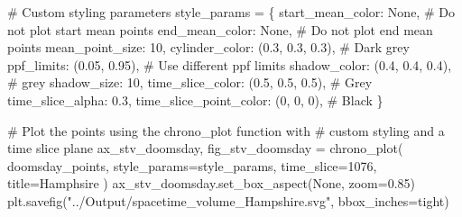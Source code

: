 \documentclass[
  11pt,
  letterpaper,
  DIV=11,
  numbers=noendperiod]{scrartcl}
\newenvironment{Shaded}{\begin{snugshade}}{\end{snugshade}}
\newcommand{\CommentTok}[1]{\textcolor[rgb]{0.37,0.37,0.37}{#1}}
\newcommand{\DecValTok}[1]{\textcolor[rgb]{0.68,0.00,0.00}{#1}}
\newcommand{\FloatTok}[1]{\textcolor[rgb]{0.68,0.00,0.00}{#1}}
\newcommand{\NormalTok}[1]{\textcolor[rgb]{0.00,0.23,0.31}{#1}}
\newcommand{\OperatorTok}[1]{\textcolor[rgb]{0.37,0.37,0.37}{#1}}
\newcommand{\StringTok}[1]{\textcolor[rgb]{0.13,0.47,0.30}{#1}}
\newcommand{\VariableTok}[1]{\textcolor[rgb]{0.07,0.07,0.07}{#1}}
\begin{document}
\begin{Shaded}
\begin{Highlighting}[]
\CommentTok{\# Custom styling parameters}
\NormalTok{style\_params }\OperatorTok{=}\NormalTok{ \{}
    \StringTok{\textquotesingle{}start\_mean\_color\textquotesingle{}}\NormalTok{: }\VariableTok{None}\NormalTok{,  }\CommentTok{\# Do not plot start mean points}
    \StringTok{\textquotesingle{}end\_mean\_color\textquotesingle{}}\NormalTok{: }\VariableTok{None}\NormalTok{, }\CommentTok{\# Do not plot end mean points}
    \StringTok{\textquotesingle{}mean\_point\_size\textquotesingle{}}\NormalTok{: }\DecValTok{10}\NormalTok{,}
    \StringTok{\textquotesingle{}cylinder\_color\textquotesingle{}}\NormalTok{: (}\FloatTok{0.3}\NormalTok{, }\FloatTok{0.3}\NormalTok{, }\FloatTok{0.3}\NormalTok{),  }\CommentTok{\# Dark grey}
    \StringTok{\textquotesingle{}ppf\_limits\textquotesingle{}}\NormalTok{: (}\FloatTok{0.05}\NormalTok{, }\FloatTok{0.95}\NormalTok{),  }\CommentTok{\# Use different ppf limits}
    \StringTok{\textquotesingle{}shadow\_color\textquotesingle{}}\NormalTok{: (}\FloatTok{0.4}\NormalTok{, }\FloatTok{0.4}\NormalTok{, }\FloatTok{0.4}\NormalTok{),  }\CommentTok{\# grey}
    \StringTok{\textquotesingle{}shadow\_size\textquotesingle{}}\NormalTok{: }\DecValTok{10}\NormalTok{,}
    \StringTok{\textquotesingle{}time\_slice\_color\textquotesingle{}}\NormalTok{: (}\FloatTok{0.5}\NormalTok{, }\FloatTok{0.5}\NormalTok{, }\FloatTok{0.5}\NormalTok{),  }\CommentTok{\# Grey}
    \StringTok{\textquotesingle{}time\_slice\_alpha\textquotesingle{}}\NormalTok{: }\FloatTok{0.3}\NormalTok{,}
    \StringTok{\textquotesingle{}time\_slice\_point\_color\textquotesingle{}}\NormalTok{: (}\DecValTok{0}\NormalTok{, }\DecValTok{0}\NormalTok{, }\DecValTok{0}\NormalTok{),  }\CommentTok{\# Black}
\NormalTok{\}}

\CommentTok{\# Plot the points using the chrono\_plot function with }
\CommentTok{\# custom styling and a time slice plane}
\NormalTok{ax\_stv\_doomsday, fig\_stv\_doomsday }\OperatorTok{=}\NormalTok{ chrono\_plot(}
\NormalTok{    doomsday\_points, }
\NormalTok{    style\_params}\OperatorTok{=}\NormalTok{style\_params, }
\NormalTok{    time\_slice}\OperatorTok{=}\DecValTok{1076}\NormalTok{,}
\NormalTok{    title}\OperatorTok{=}\StringTok{\textquotesingle{}Hamphsire\textquotesingle{}}
\NormalTok{)}
\NormalTok{ax\_stv\_doomsday.set\_box\_aspect(}\VariableTok{None}\NormalTok{, zoom}\OperatorTok{=}\FloatTok{0.85}\NormalTok{)}
\NormalTok{plt.savefig(}\StringTok{"../Output/spacetime\_volume\_Hampshire.svg"}\NormalTok{, bbox\_inches}\OperatorTok{=}\StringTok{\textquotesingle{}tight\textquotesingle{}}\NormalTok{)}
\end{Highlighting}
\end{Shaded}
\end{document}
